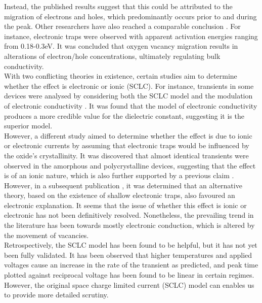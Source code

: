 \noindent Instead, the published results suggest that this could be attributed to the migration of electrons and holes, which predominantly occurs prior to and during the peak. Other researchers have also reached a comparable conclusion \cite{zhong2010transient}. For instance, electronic traps were observed with apparent activation energies ranging from 0.18-0.3eV. It was concluded that oxygen vacancy migration results in alterations of electron/hole concentrations, ultimately regulating bulk conductivity. \\

\noindent With two conflicting theories in existence, certain studies aim to determine whether the effect is electronic or ionic (SCLC). For instance, transients in some devices were analysed by considering both the SCLC model and the modulation of electronic conductivity \cite{wakiya2006activation}. It was found that the model of electronic conductivity produces a more credible value for the dielectric constant, suggesting it is the superior model. \\

\noindent However, a different study \cite{el2006space} aimed to determine whether the effect is due to ionic or electronic currents by assuming that electronic traps would be influenced by the oxide's crystallinity. It was discovered that almost identical transients were observed in the amorphous and polycrystalline devices, suggesting that the effect is of an ionic nature, which is also further supported by a previous claim \cite{zafar1998oxygen}. \\

\noindent However, in a subsequent publication \cite{el2007ionic}, it was determined that an alternative theory, based on the existence of shallow electronic traps, also favoured an electronic explanation. It seems that the issue of whether this effect is ionic or electronic has not been definitively resolved. Nonetheless, the prevailing trend in the literature has been towards mostly electronic conduction, which is altered by the movement of vacancies.\\

\noindent Retrospectively, the SCLC model has been found to be helpful, but it has not yet been fully validated. It has been observed that higher temperatures and applied voltages cause an increase in the rate of the transient as predicted, and peak time plotted against reciprocal voltage has been found to be linear in certain regimes. However, the original space charge limited current (SCLC) model can enables us to provide more detailed scrutiny.\\

